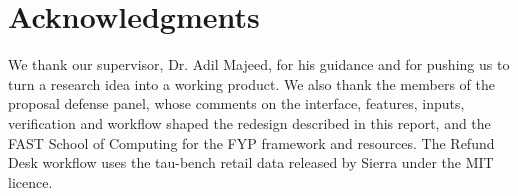 \chapter*{Acknowledgments}

We thank our supervisor, Dr. Adil Majeed, for his guidance and for pushing us to turn a research idea into a working product. We also thank the members of the proposal defense panel, whose comments on the interface, features, inputs, verification and workflow shaped the redesign described in this report, and the FAST School of Computing for the FYP framework and resources. The Refund Desk workflow uses the tau-bench retail data released by Sierra under the MIT licence.
